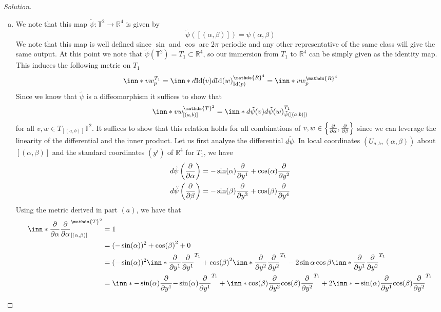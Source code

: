 \documentclass[a4paper]{article}
\begin{document}
\begin{proof}[Solution]
\begin{enumerate}[(a)]
    \item We note that this map $\tilde{\psi}: \mathds{T}^2 \rightarrow \mathds{R}^4$ is given by
      \[
        \tilde{\psi}\left([(\alpha,\beta)]\right) = \psi(\alpha,\beta)
      \]
      We note that this map is well defined since $\sin$ and $\cos$ are $2\pi$ periodic and any other representative of the same class will give the same output. At this point we note that $\tilde{\psi}(\mathds{T}^2) = T_1 \subset \mathds{R}^4$, so our immersion from $T_1$ to $\mathds{R}^4$ can be simply given as the identity map. This induces the following metric on $T_1$
      \[
        \inn*{v}{w}_p^{T_1} = \inn*{d \text{Id}(v)}{d \text{Id}(w)}_{\text{Id}(p)}^{\mathds{R}^4} = \inn*{v}{w}_p^{\mathds{R}^4}
      \]
      Since we know that $\tilde{\psi}$ is a diffeomorphism it suffices to show that
      \[
        \inn*{v}{w}_{[(a,b)]}^{\mathds{T}^2} = \inn*{d\tilde{\psi}(v)}{d\tilde{\psi}(w)}_{\tilde{\psi}([(a,b)])}^{T_1}
      \]
      for all $v,w \in T_{[(a,b)]}\mathds{T}^2$. It suffices to show that this relation holds for all combinations of $v,w \in \left\{ \pdv{\alpha}, \pdv{\beta} \right\}$ since we can leverage the linearity of the differential and the inner product. Let us first analyze the differential $d\tilde{\psi}$. In local coordinates $(U_{a,b}, (\alpha, \beta))$ about $[(\alpha, \beta)]$ and the standard coordinates $(y^i)$ of $\mathds{R}^4$ for $T_1$, we have
      \[
        \begin{aligned}
          d \tilde{\psi} \left( \pdv{\alpha} \right) &= -\sin(\alpha)\pdv{y^1} + \cos(\alpha) \pdv{y^2} \\
          d \tilde{\psi} \left( \pdv{\beta} \right) &= -\sin(\beta)\pdv{y^3} + \cos(\beta) \pdv{y^4}
        \end{aligned}
      \]
      Using the metric derived in part $(a)$, we have that
      \[
        \begin{aligned}
          \inn*{\pdv{\alpha}}{\pdv{\alpha}}_{[(\alpha,\beta)]}^{\mathds{T}^2} &= 1 \\
                                                                              &= (-\sin(\alpha))^2 + \cos(\beta)^2 + 0 \\
                                                                              &= (-\sin(\alpha))^2\inn*{\pdv{y^1}}{\pdv{y^1}}^{T_1} + \cos(\beta)^2 \inn*{\pdv{y^2}}{\pdv{y^2}}^{T_1} - 2\sin{\alpha}\cos{\beta} \inn*{\pdv{y^1}}{\pdv{y^2}}^{T_1} \\
                                                                              &= \inn*{-\sin(\alpha)\pdv{y^1}}{-\sin(\alpha) \pdv{y^1}}^{T_1} + \inn*{\cos(\beta)\pdv{y^2}}{\cos(\beta)\pdv{y^2}}^{T_1} + 2\inn*{-\sin(\alpha) \pdv{y^1}}{\cos(\beta)\pdv{y^2}}^{T_1} \\

\end{aligned}\]
\end{enumerate}
\end{proof}
\end{document}
